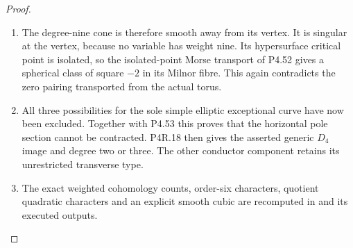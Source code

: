 \begin{proof}
\begin{enumerate}[label={$\langle1\rangle$\arabic*.},leftmargin=*]
\item The degree-nine cone is therefore smooth
away from its vertex. It is singular
at the vertex, because no variable has
weight nine. Its hypersurface critical
point is isolated, so the isolated-point
Morse transport of P4.52 gives a spherical
class of square $-2$ in its Milnor fibre.
This again contradicts the zero pairing
transported from the actual torus.

\item All three possibilities for the sole
simple elliptic exceptional curve have
now been excluded. Together with P4.53
this proves that the horizontal pole
section cannot be contracted. P4R.18
then gives the asserted generic $D_4$
image and degree two or three. The
other conductor component retains its
unrestricted transverse type.

\item The exact weighted cohomology counts,
order-six characters, quotient quadratic
characters and an explicit smooth cubic
are recomputed in
\allowbreak{}
and its executed outputs.

\end{enumerate}
\end{proof}
